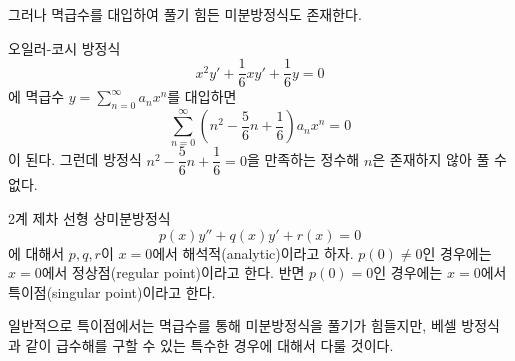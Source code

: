 \documentclass[../engineering_mathematics_lecture_note.tex]{subfiles}
\begin{document}
그러나 멱급수를 대입하여 풀기 힘든 미분방정식도 존재한다.
\begin{example}
    오일러-코시 방정식
    \begin{equation*}
        x^2 y' + \frac 16 x y' + \frac 16 y = 0
    \end{equation*}
    에 멱급수 $y = \sum_{n = 0}^\infty a_n x^n$를 대입하면
    \begin{equation*}
        \sum^{\infty}_{n = 0} \left( n^2 - \frac 56 n + \frac 16 \right) a_n x^n = 0
    \end{equation*}
    이 된다.
    그런데 방정식 $n^2 - \dfrac 56 n + \dfrac 16 = 0$을 만족하는 정수해 $n$은 존재하지 않아 풀 수 없다.
\end{example}

\begin{definition}
    2계 제차 선형 상미분방정식
    \begin{equation*}
        p(x) y'' + q(x) y' + r(x) = 0
    \end{equation*}
    에 대해서 $p, q, r$이 $x = 0$에서 해석적(analytic)이라고 하자.
    $p(0) \neq 0$인 경우에는 $x = 0$에서 정상점(regular point)이라고 한다.
    반면 $p(0) = 0$인 경우에는 $x = 0$에서 특이점(singular point)이라고 한다.
\end{definition}

일반적으로 특이점에서는 멱급수를 통해 미분방정식을 풀기가 힘들지만, 베셀 방정식과 같이 급수해를 구할 수 있는 특수한 경우에 대해서 다룰 것이다.
\end{document}
